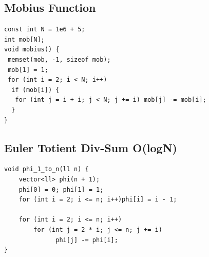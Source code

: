 \documentclass[a4paper,11pt,oneside]{article}
\begin{document}
\begin{multicols*}{\COLS}
\subsection{Mobius Function}
\begin{lstlisting}
const int N = 1e6 + 5;
int mob[N];
void mobius() {
 memset(mob, -1, sizeof mob);
 mob[1] = 1;
 for (int i = 2; i < N; i++)
  if (mob[i]) {
   for (int j = i + i; j < N; j += i) mob[j] -= mob[i];
  }
}
\end{lstlisting}
\subsection{Euler Totient Div-Sum O(logN)}
\begin{lstlisting}
void phi_1_to_n(ll n) {
    vector<ll> phi(n + 1);
    phi[0] = 0; phi[1] = 1;
    for (int i = 2; i <= n; i++)phi[i] = i - 1;

    for (int i = 2; i <= n; i++)
        for (int j = 2 * i; j <= n; j += i)
              phi[j] -= phi[i];
}
\end{lstlisting}


\end{multicols*}
\end{document}
